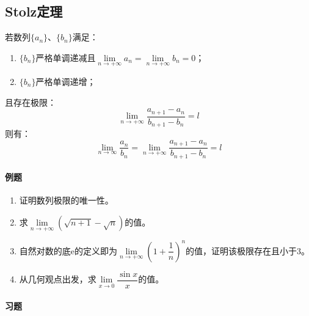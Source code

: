 \documentclass[fontset=none,openany,a4paper]{ctexbook}
\begin{document}
\subsection{Stolz定理}

若数列$\{a_n\}$、$\{b_n\}$满足：
\begin{enumerate}
    \item $\{b_n\}$严格单调递减且$\lim\limits_{n\to+\infty}a_n=\lim\limits_{n\to+\infty}b_n=0$；

    \item $\{b_n\}$严格单调递增；
\end{enumerate}
且存在极限：
\[
\lim_{n\to+\infty}\frac{a_{n+1}-a_n}{b_{n+1}-b_n} = l
\]
则有：
\[
\lim_{n\to\infty}\frac{a_n}{b_n} = \lim_{n\to+\infty}\frac{a_{n+1}-a_n}{b_{n+1}-b_n} = l
\]


\paragraph{例题}

\begin{enumerate}

    \item 证明数列极限的唯一性。

    \item 求$\lim\limits_{n\to+\infty}(\sqrt{n+1}-\sqrt{n})$的值。

    \item 自然对数的底$\mathrm{e}$的定义即为$\lim\limits_{n\to+\infty}\left(1+\dfrac{1}{n}\right)^n$的值，证明该极限存在且小于3。

    \item 从几何观点出发，求$\lim\limits_{x\to 0}\dfrac{\sin x}{x}$的值。

\end{enumerate}

\paragraph{习题}
\end{document}
